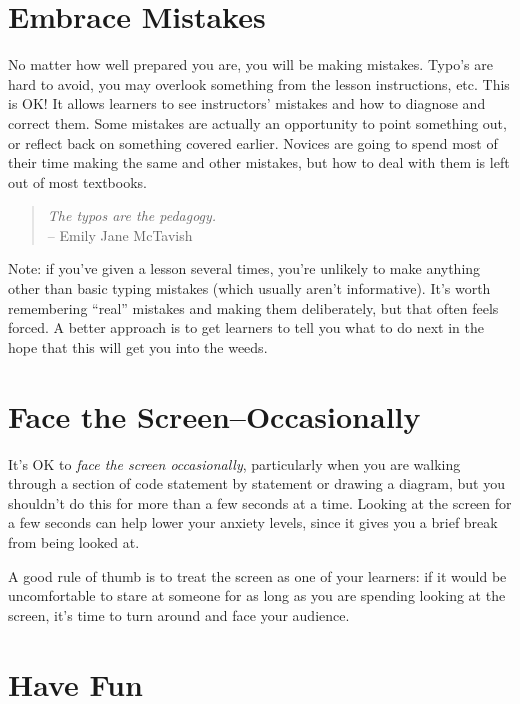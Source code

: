 \documentclass[10pt,statementpaper]{memoir}
\begin{document}
\section{Embrace Mistakes}\label{embrace-mistakes}

No matter how well prepared you are, you will be making mistakes. Typo's
are hard to avoid, you may overlook something from the lesson
instructions, etc. This is OK! It allows learners to see instructors'
mistakes and how to diagnose and correct them. Some mistakes are
actually an opportunity to point something out, or reflect back on
something covered earlier. Novices are going to spend most of their time
making the same and other mistakes, but how to deal with them is left
out of most textbooks.

\begin{quote}
\emph{The typos are the pedagogy.}\\
-- Emily Jane McTavish
\end{quote}

Note: if you've given a lesson several times, you're unlikely to make
anything other than basic typing mistakes (which usually aren't
informative). It's worth remembering ``real'' mistakes and making them
deliberately, but that often feels forced. A better approach is to get
learners to tell you what to do next in the hope that this will get you
into the weeds.

\section{Face the
Screen--Occasionally}\label{face-the-screenoccasionally}

It's OK to \emph{face the screen occasionally}, particularly when you
are walking through a section of code statement by statement or drawing
a diagram, but you shouldn't do this for more than a few seconds at a
time. Looking at the screen for a few seconds can help lower your
anxiety levels, since it gives you a brief break from being looked at.

A good rule of thumb is to treat the screen as one of your learners: if
it would be uncomfortable to stare at someone for as long as you are
spending looking at the screen, it's time to turn around and face your
audience.

\section{Have Fun}\label{have-fun}
\end{document}
